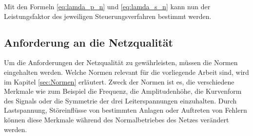 Mit den Formeln \ref{eq:lamda_p_n} und \ref{eq:lamda_s_n} kann nun der Leistungsfaktor des jeweiligen Steuerungsverfahren bestimmt werden.   



\subsection{Anforderung an die Netzqualität}

Um die Anforderungen der Netzqualität zu gewährleisten, müssen die Normen eingehalten werden. Welche Normen relevant für die vorliegende Arbeit sind, wird im Kapitel \ref{sec:Normen} erläutert. Zweck der Normen ist es, die verschiedene Merkmale wie zum Beispiel die Frequenz, die Amplitudenhöhe, die Kurvenform des Signals oder die Symmetrie der drei Leiterspannungen einzuhalten. Durch Lastspannung, Störeinflüsse von bestimmten Anlagen oder Auftreten von Fehlern können diese Merkmale während des Normalbetriebes des Netzes verändert werden. 


